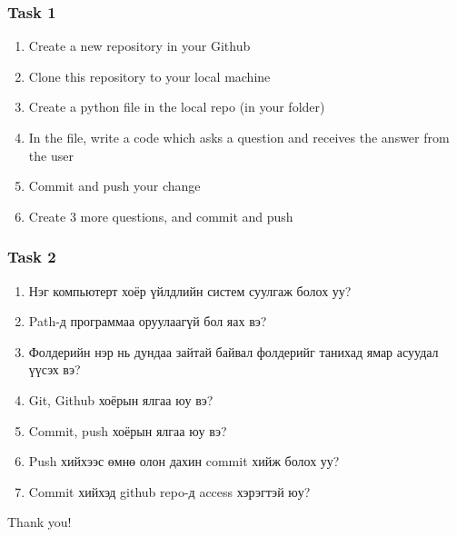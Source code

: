 \documentclass{beamer}
\begin{document}
\begin{frame}
    \frametitle{Task 1}
    \begin{enumerate}
        \item Create a new repository in your Github
        \item Clone this repository to your local machine
        \item Create a python file in the local repo (in your folder)
        \item In the file, write a code which asks a question and 
        receives the answer from the user
        \item Commit and push your change
        \item Create 3 more questions, and commit and push
    \end{enumerate}
\end{frame}

\begin{frame}
    \frametitle{Task 2}
    \begin{enumerate}
        \item Нэг компьютерт хоёр үйлдлийн систем суулгаж болох уу?
        \item Path-д программаа оруулаагүй бол яах вэ?
        \item Фолдерийн нэр нь дундаа зайтай байвал фолдерийг танихад ямар асуудал үүсэх вэ?
        \item Git, Github хоёрын ялгаа юу вэ?
        \item Commit, push хоёрын ялгаа юу вэ?
        \item Push хийхээс өмнө олон дахин commit хийж болох уу?
        \item Commit хийхэд github repo-д access хэрэгтэй юу?
    \end{enumerate}
\end{frame}

\begin{frame}
\Huge{\centerline{Thank you!}}
\end{frame}

\end{document}
